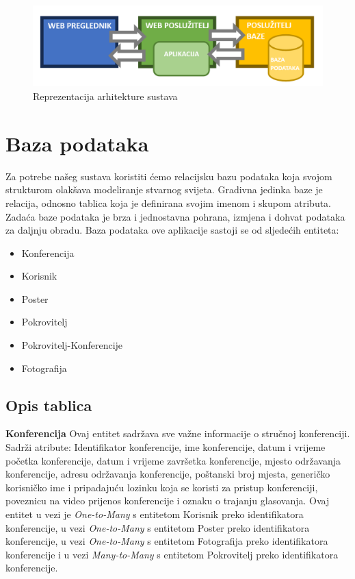 \begin{figure} [hbt!]
	\includegraphics[width=\linewidth]{Slike/ArhitekturaSustava}
	\caption{Reprezentacija arhitekture sustava}
\end{figure}

		\clearpage

		\section{Baza podataka}
			
		Za potrebe našeg sustava koristiti ćemo relacijsku bazu podataka koja svojom strukturom olakšava modeliranje stvarnog svijeta. Gradivna jedinka baze je relacija, odnosno tablica koja je definirana svojim imenom i skupom atributa. Zadaća baze podataka je brza i jednostavna pohrana, izmjena i dohvat podataka za daljnju obradu.
		Baza podataka ove aplikacije sastoji se od sljedećih entiteta: 
		
		\begin{itemize}
			\item Konferencija
			\item Korisnik
			\item Poster
			\item Pokrovitelj
			\item Pokrovitelj-Konferencije
			\item Fotografija
		\end{itemize}
		
		\clearpage
		
		\subsection{Opis tablica}
	
	\noindent\textbf{Konferencija } Ovaj entitet sadržava sve važne informacije o stručnoj konferenciji. Sadrži atribute: Identifikator konferencije, ime konferencije, datum i vrijeme početka konferencije, datum i vrijeme završetka konferencije, mjesto održavanja konferencije, adresu održavanja konferencije, poštanski broj mjesta, generičko korisničko ime i pripadajuću lozinku koja se koristi za pristup konferenciji, poveznicu na video prijenos konferencije i oznaku o trajanju glasovanja. Ovaj entitet u vezi je \textit{One-to-Many} s entitetom Korisnik preko identifikatora konferencije, u vezi \textit{One-to-Many} s entitetom Poster preko identifikatora konferencije, u vezi \textit{One-to-Many} s entitetom Fotografija preko identifikatora konferencije i u vezi \textit{Many-to-Many} s entitetom Pokrovitelj preko identifikatora konferencije. 
	
